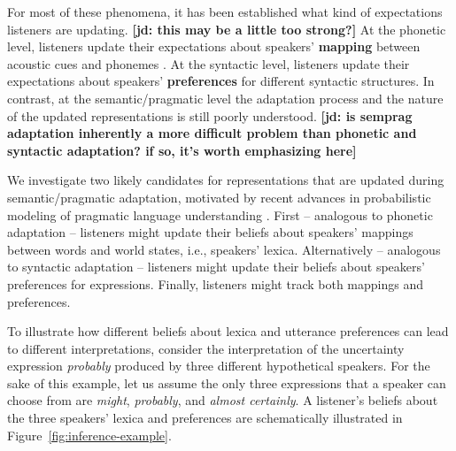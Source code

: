 \documentclass[lucida,biblatex]{sp} %
\newcommand{\jd}[1]{\textcolor{PinkyPurple}{\textbf{[jd: #1]}}}
\begin{document}
For most of these phenomena, it has been established what kind of expectations listeners are updating. \jd{this may be a little too strong?} At the phonetic level, 
listeners update their expectations about speakers' \textbf{mapping} between acoustic cues and phonemes \citep[e.g.,][]{Kleinschmidt2015}.
At the syntactic level, listeners update their expectations about speakers' \textbf{preferences} 
for different syntactic structures. In contrast, at the semantic/pragmatic level the adaptation process and the nature of the updated representations is still poorly understood. \jd{is semprag adaptation inherently a more difficult problem than phonetic and syntactic adaptation? if so, it's worth emphasizing here}

We investigate two likely candidates for representations that are updated during semantic/pragmatic adaptation, motivated by recent advances in probabilistic modeling of pragmatic language understanding \cite{FrankGoodman2012,GoodmanFrank2016,FrankeJaeger2016}. First -- analogous to phonetic adaptation -- listeners might update their beliefs about speakers' mappings between 
words and world states, i.e., speakers' lexica. Alternatively -- analogous to syntactic adaptation -- 
listeners might update their beliefs about speakers' preferences
for expressions. Finally, listeners might track both mappings and preferences.

To illustrate how different beliefs about lexica and utterance preferences can lead to different interpretations, consider the interpretation 
of the uncertainty expression \textit{probably} produced by three different hypothetical speakers. For the sake of this example, 
let us assume the only three expressions that a speaker can choose from are \textit{might}, \textit{probably}, and \textit{almost certainly}.
A listener's beliefs about the three speakers' lexica and preferences are schematically illustrated in Figure~\ref{fig:inference-example}.
\end{document}
